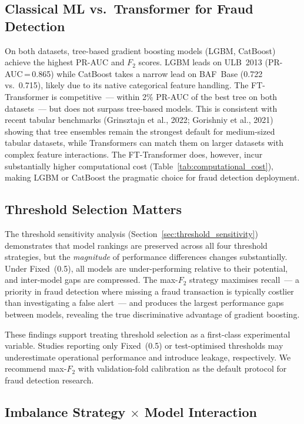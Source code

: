 \subsection{Classical ML vs.\ Transformer for Fraud Detection}

On both datasets, tree-based gradient boosting models (LGBM, CatBoost)
achieve the highest PR-AUC and $F_2$ scores.
LGBM leads on ULB~2013 (PR-AUC\,=\,0.865) while CatBoost takes a narrow
lead on BAF~Base (0.722 vs.\ 0.715), likely due to its native categorical
feature handling.
The FT-Transformer is competitive~--- within 2\% PR-AUC of the best tree
on both datasets~--- but does not surpass tree-based models.
This is consistent with recent tabular benchmarks (Grinsztajn et al., 2022;
Gorishniy et al., 2021) showing that tree ensembles remain the strongest
default for medium-sized tabular datasets, while Transformers can match
them on larger datasets with complex feature interactions.
The FT-Transformer does, however, incur substantially higher computational
cost (Table~\ref{tab:computational_cost}), making LGBM or CatBoost
the pragmatic choice for fraud detection deployment.

\subsection{Threshold Selection Matters}

The threshold sensitivity analysis (Section~\ref{sec:threshold_sensitivity})
demonstrates that model rankings are preserved across all four threshold
strategies, but the \emph{magnitude} of performance differences changes
substantially.
Under Fixed~(0.5), all models are under-performing relative to their
potential, and inter-model gaps are compressed.
The max-$F_2$ strategy maximises recall~--- a priority in fraud detection
where missing a fraud transaction is typically costlier than investigating
a false alert~--- and produces the largest performance gaps between models,
revealing the true discriminative advantage of gradient boosting.

These findings support treating threshold selection as a first-class
experimental variable.
Studies reporting only Fixed~(0.5) or test-optimised thresholds
may underestimate operational performance and introduce leakage, respectively.
We recommend max-$F_2$ with validation-fold calibration as the default
protocol for fraud detection research.

\subsection{Imbalance Strategy $\times$ Model Interaction}

